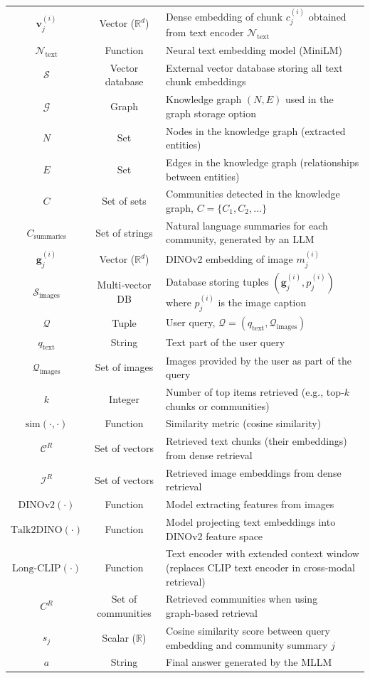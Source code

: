 \begin{tabularx}{\textwidth}{@{} c c X @{}}
    $\mathbf{v}_j^{(i)}$ & Vector ($\mathbb{R}^d$) & Dense embedding of chunk $c_j^{(i)}$ obtained from text encoder $\mathcal{N}_{\text{text}}$ \\
    $\mathcal{N}_{\text{text}}$ & Function & Neural text embedding model (MiniLM) \\
    $\mathcal{S}$ & Vector database & External vector database storing all text chunk embeddings \\
    $\mathcal{G}$ & Graph & Knowledge graph $(N, E)$ used in the graph storage option \\
    $N$ & Set & Nodes in the knowledge graph (extracted entities) \\
    $E$ & Set & Edges in the knowledge graph (relationships between entities) \\
    $C$ & Set of sets & Communities detected in the knowledge graph, $C = \{C_1, C_2, \dots\}$ \\
    $C_{\text{summaries}}$ & Set of strings & Natural language summaries for each community, generated by an LLM \\
    $\mathbf{g}_j^{(i)}$ & Vector ($\mathbb{R}^d$) & DINOv2 embedding of image $m_j^{(i)}$ \\
    $\mathcal{S}_{\text{images}}$ & Multi‑vector DB & Database storing tuples $(\mathbf{g}_j^{(i)}, p_j^{(i)})$ where $p_j^{(i)}$ is the image caption \\
    $\mathcal{Q}$ & Tuple & User query, $\mathcal{Q} = (q_{\text{text}}, \mathcal{Q}_{\text{images}})$ \\
    $q_{\text{text}}$ & String & Text part of the user query \\
    $\mathcal{Q}_{\text{images}}$ & Set of images & Images provided by the user as part of the query \\
    $k$ & Integer & Number of top items retrieved (e.g., top‑$k$ chunks or communities) \\
    $\mathrm{sim}(\cdot, \cdot)$ & Function & Similarity metric (cosine similarity) \\
    $\mathcal{C}^R$ & Set of vectors & Retrieved text chunks (their embeddings) from dense retrieval \\
    $\mathcal{I}^R$ & Set of vectors & Retrieved image embeddings from dense retrieval \\
    $\mathrm{DINOv2}(\cdot)$ & Function & Model extracting features from images \\
    $\mathrm{Talk2DINO}(\cdot)$ & Function & Model projecting text embeddings into DINOv2 feature space \\
    $\mathrm{Long\text{-}CLIP}(\cdot)$ & Function & Text encoder with extended context window (replaces CLIP text encoder in cross‑modal retrieval) \\
    $C^R$ & Set of communities & Retrieved communities when using graph‑based retrieval \\
    $s_j$ & Scalar ($\mathbb{R}$) & Cosine similarity score between query embedding and community summary $j$ \\
    $a$ & String & Final answer generated by the MLLM \\
    \bottomrule
\end{tabularx}